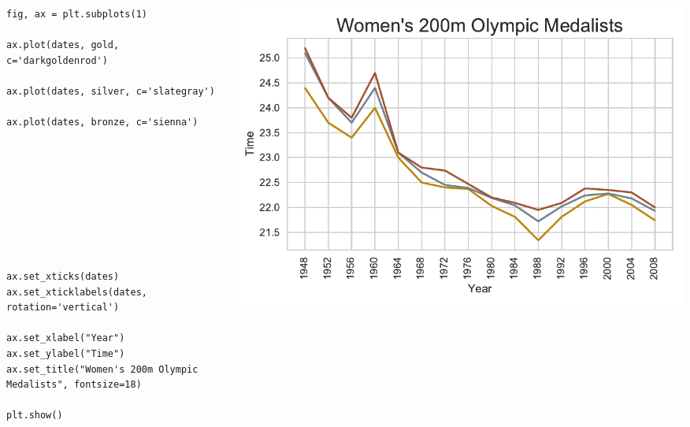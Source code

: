 \documentclass{beamer}
\begin{document}
\begin{frame}[fragile]
\tiny{
\begin{columns}
\begin{column}{0.45\textwidth}
\begin{verbatim}
fig, ax = plt.subplots(1)

ax.plot(dates, gold, c='darkgoldenrod')

ax.plot(dates, silver, c='slategray')

ax.plot(dates, bronze, c='sienna')









ax.set_xticks(dates)
ax.set_xticklabels(dates, rotation='vertical')

ax.set_xlabel("Year")
ax.set_ylabel("Time")
ax.set_title("Women's 200m Olympic Medalists", fontsize=18)

plt.show()
\end{verbatim}
\end{column}
\begin{column}{0.55\textwidth}
\includegraphics[width=\textwidth]{../olympics_4.pdf}
\end{column}
\end{columns}
}
\end{frame}
\end{document}
